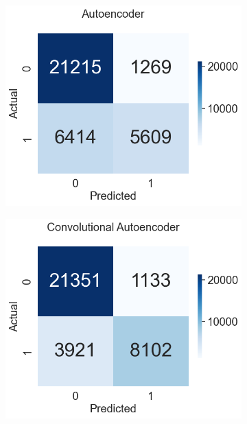\documentclass[a4paper,12pt]{report}
\theoremstyle{definitionNODot}
\begin{document}
	\begin{figure}[H]
		\centering
		\begin{subfigure}[b]{0.35\textwidth}
			\centering
			\includegraphics[width=\textwidth]{anomaly_by_autoencoder.png}
			
			\label{fig:anomaly_by_autoencoder}
		\end{subfigure}
		\hfil
		\begin{subfigure}[b]{0.35\textwidth}
			\centering
			\includegraphics[width=\textwidth]{anomaly_by_conv_ae.png}
			

\end{subfigure}
\end{figure}
\end{document}
